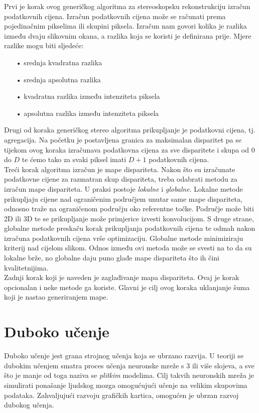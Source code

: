 \documentclass[times, utf8, zavrsni, numeric]{fer}
\begin{document}
Prvi je korak ovog generičkog algoritma za stereoskopsku rekonstrukciju izračun podatkovnih cijena. Izračun podatkovnih cijena može se računati prema pojedinačnim pikselima ili skupini piksela.  Izračun nam govori kolika je razlika između dvaju slikovnim okana, a razlika koja se koristi je definirana prije. Mjere razlike mogu biti sljedeće:
\begin{itemize}
\item[•] srednja kvadratna razlika
\item[•] srednja apsolutna razlika
\item[•] kvadratna razlika između intenziteta piksela
\item[•] apsolutna razlika između intenziteta piksela
\end{itemize}

\newpage
Drugi od koraka generičkog stereo algoritma prikupljanje je podatkovni cijena, tj. agregacija.  Na početku je postavljena granica za maksimalan disparitet pa se tijekom ovog koraka izračunava podatkovna cijena za sve disparitete i skupa  od $0$ do $D$ te ćemo tako za svaki piksel imati $D+1$ podatkovnih cijena.\\
Treći korak algoritma izračun je mape dispariteta. Nakon što su izračunate podatkovne cijene za razmatran skup dispariteta, treba odabrati metodu za izračun mape dispariteta. U praksi postoje \textit{lokalne} i \textit{globalne}. Lokalne metode prikupljaju cijene nad ograničenim područjem unutar same mape dispariteta, odnosno traže na ograničenom području oko referentne točke. Područje može biti 2D ili 3D te se prikupljanje može primjerice izvesti konvolucijom. S druge strane, globalne metode  preskaču korak prikupljanja podatkovnih cijena te odmah nakon izračuna podatkovnih cijena vrše optimizaciju. Globalne metode minimiziraju kriterij nad cijelom slikom. Odnos između ovi metoda može se svesti na to da su lokalne brže, no globalne daju puno glađe mape dispariteta što ih čini kvalitetnijima.\\
Zadnji korak koji je naveden je zaglađivanje mapa dispariteta. Ovaj je korak opcionalan i neke metode ga koriste. Glavni je cilj ovog koraka uklanjanje šuma koji je nastao generiranjem mape. 
\chapter{Duboko učenje}
Duboko učenje jest grana strojnog učenja koja se ubrzano razvija. U teoriji se dubokim učenjem smatra proces učenja neuronske mreže s 3 ili više slojeva, a  sve što je manje od toga naziva se \textit{plitkim} modelima. Cilj takvih neuronskih mreža je simulirati ponašanje ljudskog mozga omogućujući učenje na velikim skupovima podataka. Zahvaljujući razvoju grafičkih kartica, omogućen je ubrzan razvoj dubokog učenja.
\end{document}
